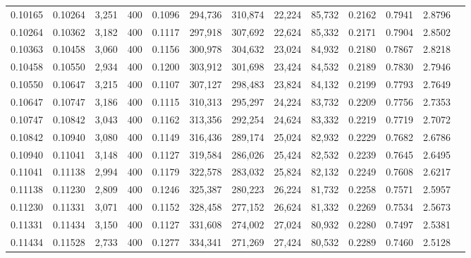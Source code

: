 \begin{tabular}{rrrrrrrrrrrrr}
0.10165 & 0.10264 &  3,251 & 400 &                                     0.1096 & 294,736 & 310,874 &  22,224 &  85,732 & 0.2162 & 0.7941 & 2.8796 \\
0.10264 & 0.10362 &  3,182 & 400 &                                     0.1117 & 297,918 & 307,692 &  22,624 &  85,332 & 0.2171 & 0.7904 & 2.8502 \\
0.10363 & 0.10458 &  3,060 & 400 &                                     0.1156 & 300,978 & 304,632 &  23,024 &  84,932 & 0.2180 & 0.7867 & 2.8218 \\
0.10458 & 0.10550 &  2,934 & 400 &                                     0.1200 & 303,912 & 301,698 &  23,424 &  84,532 & 0.2189 & 0.7830 & 2.7946 \\
0.10550 & 0.10647 &  3,215 & 400 &                                     0.1107 & 307,127 & 298,483 &  23,824 &  84,132 & 0.2199 & 0.7793 & 2.7649 \\
0.10647 & 0.10747 &  3,186 & 400 &                                     0.1115 & 310,313 & 295,297 &  24,224 &  83,732 & 0.2209 & 0.7756 & 2.7353 \\
0.10747 & 0.10842 &  3,043 & 400 &                                     0.1162 & 313,356 & 292,254 &  24,624 &  83,332 & 0.2219 & 0.7719 & 2.7072 \\
0.10842 & 0.10940 &  3,080 & 400 &                                     0.1149 & 316,436 & 289,174 &  25,024 &  82,932 & 0.2229 & 0.7682 & 2.6786 \\
0.10940 & 0.11041 &  3,148 & 400 &                                     0.1127 & 319,584 & 286,026 &  25,424 &  82,532 & 0.2239 & 0.7645 & 2.6495 \\
0.11041 & 0.11138 &  2,994 & 400 &                                     0.1179 & 322,578 & 283,032 &  25,824 &  82,132 & 0.2249 & 0.7608 & 2.6217 \\
0.11138 & 0.11230 &  2,809 & 400 &                                     0.1246 & 325,387 & 280,223 &  26,224 &  81,732 & 0.2258 & 0.7571 & 2.5957 \\
0.11230 & 0.11331 &  3,071 & 400 &                                     0.1152 & 328,458 & 277,152 &  26,624 &  81,332 & 0.2269 & 0.7534 & 2.5673 \\
0.11331 & 0.11434 &  3,150 & 400 &                                     0.1127 & 331,608 & 274,002 &  27,024 &  80,932 & 0.2280 & 0.7497 & 2.5381 \\
0.11434 & 0.11528 &  2,733 & 400 &                                     0.1277 & 334,341 & 271,269 &  27,424 &  80,532 & 0.2289 & 0.7460 & 2.5128 \\

\end{tabular}
